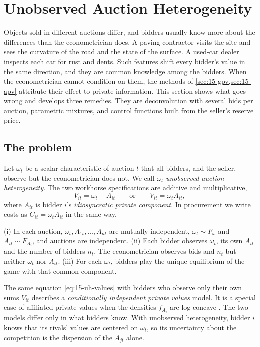 \section{Unobserved Auction Heterogeneity}\label{sec:15-uh}

Objects sold in different auctions differ, and bidders usually know more about the differences than
the econometrician does. A paving contractor visits the site and sees the curvature of the road and
the state of the surface. A used-car dealer inspects each car for rust and dents. Such features
shift every bidder's value in the same direction, and they are common knowledge among the bidders.
When the econometrician cannot condition on them, the methods of \cref{sec:15-gpv,sec:15-apv}
attribute their effect to private information. This section shows what goes wrong and develops
three remedies. They are deconvolution with several bids per auction, parametric mixtures, and
control functions built from the seller's reserve price.

\subsection{The problem}\label{sec:15-uh-problem}

Let $\omega_t$ be a scalar characteristic of auction $t$ that all bidders, and the seller, observe
but the econometrician does not. We call $\omega_t$ \emph{unobserved auction heterogeneity}. The two
workhorse specifications are additive and multiplicative,
\begin{equation}\label{eq:15-uh-values}
V_{it}=\omega_t+A_{it}\qquad\text{or}\qquad V_{it}=\omega_tA_{it},
\end{equation}
where $A_{it}$ is bidder $i$'s \emph{idiosyncratic private component}. In procurement we write
costs as $C_{it}=\omega_tA_{it}$ in the same way.

\begin{assumption}\label{ass:15-uh}
(i) In each auction, $\omega_t,A_{1t},\dots,A_{nt}$ are mutually independent, $\omega_t\sim F_\omega$
and $A_{it}\sim F_{A_i}$, and auctions are independent. (ii) Each bidder observes $\omega_t$, its own
$A_{it}$ and the number of bidders $n_t$. The econometrician observes bids and $n_t$ but neither
$\omega_t$ nor $A_{it}$. (iii) For each $\omega_t$, bidders play the unique equilibrium of the game
with that common component.
\end{assumption}

The same equation \eqref{eq:15-uh-values} with bidders who observe only their own sums $V_{it}$
describes a \emph{conditionally independent private values} model. It is a special case of affiliated
private values when the densities $f_{A_i}$ are log-concave \citep[Section 6.1.2]{AtheyHaile2007}.
The two models differ only in what bidders know. With unobserved heterogeneity, bidder $i$ knows
that its rivals' values are centered on $\omega_t$, so its uncertainty about the competition is the
dispersion of the $A_{jt}$ alone.


